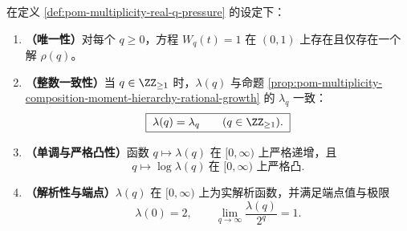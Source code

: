 \begin{theorem}\label{thm:pom-multiplicity-real-q-pressure}
在定义 \ref{def:pom-multiplicity-real-q-pressure} 的设定下：
\begin{enumerate}
  \item \textbf{（唯一性）}对每个 \(q\ge 0\)，方程 \(W_q(t)=1\) 在 \((0,1)\) 上存在且仅存在一个解 \(\rho(q)\)。
  \item \textbf{（整数一致性）}当 \(q\in\ZZ_{\ge 1}\) 时，\(\lambda(q)\) 与命题 \ref{prop:pom-multiplicity-composition-moment-hierarchy-rational-growth} 的 \(\lambda_q\) 一致：
  \[
  \boxed{\;\lambda(q)=\lambda_q\qquad(q\in\ZZ_{\ge 1}).\;}
  \]
  \item \textbf{（单调与严格凸性）}函数 \(q\mapsto \lambda(q)\) 在 \([0,\infty)\) 上严格递增，且
  \[
  \boxed{\;q\mapsto \log \lambda(q)\ \text{在 }[0,\infty)\text{ 上严格凸}.\;}
  \]
  \item \textbf{（解析性与端点）}\(\lambda(q)\) 在 \([0,\infty)\) 上为实解析函数，并满足端点值与极限
  \[
  \boxed{\;\lambda(0)=2,\qquad \lim_{q\to\infty}\frac{\lambda(q)}{2^{q}}=1.\;}
  \]
\end{enumerate}
\end{theorem}
